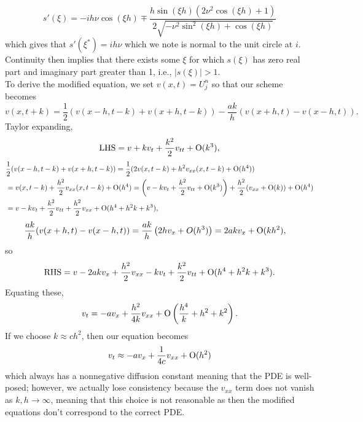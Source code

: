 \documentclass{article}
\begin{document}
\[
s'(\xi)=-ih\nu\cos(\xi h)\mp\frac{h\sin(\xi h)(2\nu^2\cos(\xi h)+1)}{2\sqrt{-\nu^2\sin^2(\xi h)+\cos(\xi h)}}
\]
which gives that $s'(\xi^*)=ih\nu$ which we note is normal to the unit circle at $i$. Continuity then implies that there exists some $\xi$ for which $s(\xi)$ has zero real part and imaginary part greater than 1, i.e., $|s(\xi)|>1$. \\
To derive the modified equation, we set $v(x,t)=U_j^n$ so that our scheme becomes 
\[
v(x,t+k)=\frac{1}{2}(v(x-h,t-k)+v(x+h,t-k))-\frac{ak}{h}(v(x+h,t)-v(x-h,t)).
\]
Taylor expanding,
\[
\text{LHS}=v+kv_t+\frac{k^2}{2}v_{tt}+\operatorname{O}(k^3),
\]
\begin{align*}
&\frac{1}{2}(v(x-h,t-k)+v(x+h,t-k))=\frac{1}{2}(2v(x,t-k)+h^2v_{xx}(x,t-k)+\operatorname{O}(h^4))\\&=
v(x,t-k)+\frac{h^2}{2}v_{xx}(x,t-k)+\operatorname{O}(h^4)=\left(v-kv_t+\frac{k^2}{2}v_{tt}+\operatorname{O}(k^3)\right)+\frac{h^2}{2}(v_{xx}+\operatorname{O}(k))+\operatorname{O}(h^4)\\&=
v-kv_t+\frac{k^2}{2}v_{tt}+\frac{h^2}{2}v_{xx}+\operatorname{O}(h^4+h^2k+k^3),
\end{align*}
\begin{align*}
&\frac{ak}{h}(v(x+h,t)-v(x-h,t))=\frac{ak}{h}\left(2hv_x+O(h^3)\right)=2akv_x+\operatorname{O}(kh^2),
\end{align*}
so 
\[
\text{RHS}=v-2akv_x+\frac{h^2}{2}v_{xx}-kv_t+\frac{k^2}{2}v_{tt}+\operatorname{O}(h^4+h^2k+k^3).
\]
Equating these,
\begin{align*}
	v_t=-av_x+\frac{h^2}{4k}v_{xx}+\operatorname{O}\left(\frac{h^4}{k}+h^2+k^2\right).
\end{align*}
If we choose $k\approx ch^2$, then our equation becomes
\[
v_t\approx-av_x+\frac{1}{4c}v_{xx}+\operatorname{O}(h^2)
\]
which always has a nonnegative diffusion constant meaning that the PDE is well-posed; however, we actually lose consistency because the $v_{xx}$ term does not vanish as $k,h\to\infty$, meaning that this choice is not reasonable as then the modified equations don't correspond to the correct PDE.
\end{document}
